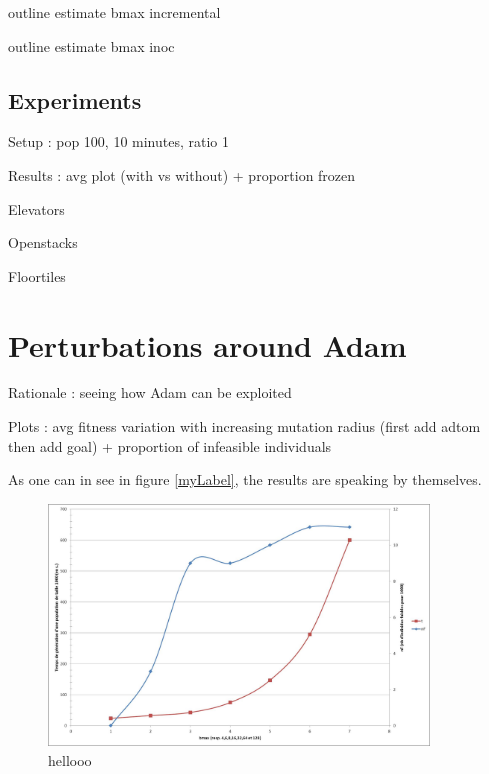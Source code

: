 \documentclass[english]{DESCARWINreport}
\begin{document}
outline estimate bmax incremental

outline estimate bmax inoc


\subsection{Experiments}

Setup : pop 100, 10 minutes, ratio 1%

Results : avg plot (with vs without) + proportion frozen

Elevators

Openstacks

Floortiles





\section{Perturbations around Adam}


Rationale : seeing how Adam can be exploited

Plots : avg fitness variation with increasing mutation radius (first add adtom then add goal) + proportion of infeasible individuals

As one can in see in figure \ref{myLabel}, the results are speaking by themselves.



\begin{figure}
	\centering
		\includegraphics[width=0.9\textwidth]{pics/bmax.eps}
	\caption{hellooo}
	\label{fig:bmax}
\end{figure}
\end{document}
